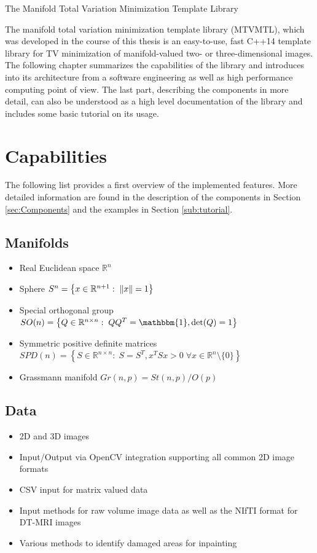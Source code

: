 \begin{chapter}{The Manifold Total Variation Minimization Template Library}
\label{ch:library}

The manifold total variation minimization template library (MTVMTL), which was developed in the course of this thesis is an easy-to-use, fast C++14 template library for TV minimization of manifold-valued two- or three-dimensional images. \\

The following chapter summarizes the capabilities of the library
and introduces into its architecture from a software engineering as well as high performance computing point of view. The last part,
describing the components in more detail, can also be understood as a high level documentation of the library and includes some basic tutorial on its usage.


\section{Capabilities} %
\label{sec:Capabilities}
The following list provides a first overview of the implemented features. More detailed
information are found in the description of the components in Section \ref{sec:Components}
and the examples in Section \ref{sub:tutorial}.
\subsection*{Manifolds} %
\label{sub:supportedManifolds}
\begin{itemize}
    \item Real Euclidean space $\mathbb{R}^n$
    \item Sphere $S^n=\left\lbrace x\in\mathbb{R}^{n+1}:\; \| x \|=1\right\rbrace$
    \item Special orthogonal group $SO(n)=\left\lbrace Q\in\mathbb{R}^{n\times n}:\; QQ^T=\mathbbm{1}, \operatorname{det}(Q)=1 \right\rbrace$
    \item Symmetric positive definite matrices $SPD(n)=\left\lbrace S\in\mathbb{R}^{n\times n}:\; S=S^T, x^TSx>0\; \forall x\in\mathbb{R}^n\setminus\lbrace 0\rbrace \right\rbrace$
    \item Grassmann manifold $Gr(n,p) = St(n,p) / O(p)$
\end{itemize}

\subsection*{Data} %
\label{sub:Data}
\begin{itemize}
	\item 2D and 3D images
	\item Input/Output via OpenCV integration supporting all common 2D image formats
	\item CSV input for matrix valued data
	\item Input methods for raw volume image data as well as the NIfTI \cite{nifti} format for DT-MRI images
	\item Various methods to identify damaged areas for inpainting
\end{itemize}


\end{chapter}
